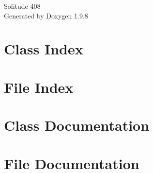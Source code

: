 \documentclass[twoside]{book}
\newcommand{\+}{\discretionary{\mbox{\scriptsize$\hookleftarrow$}}{}{}}
\newcommand{\clearemptydoublepage}{%
    \newpage{\pagestyle{empty}\cleardoublepage}%
  }
\begin{document}
  \raggedbottom
    \hypersetup{pageanchor=false,
                bookmarksnumbered=true,
                pdfencoding=unicode
               }
  \begin{titlepage}
  \vspace*{7cm}
  \begin{center}%
  {\Large Solitude 408}\\
  \vspace*{1cm}
  {\large Generated by Doxygen 1.9.8}\\
  \end{center}
  \end{titlepage}
  \clearemptydoublepage
  \tableofcontents
  \clearemptydoublepage
  \hypersetup{pageanchor=true}

\chapter{Class Index}

\chapter{File Index}

\chapter{Class Documentation}





\chapter{File Documentation}










































  \backmatter
  \newpage
  \clearemptydoublepage
  \printindex
\end{document}
